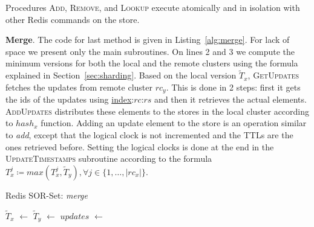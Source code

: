 Procedures {\small\textsc{Add}}, {\small\textsc{Remove}}, and
{\small\textsc{Lookup}} execute atomically and in isolation with other Redis
commands on the store.

\textbf{Merge}. The code for last method is given in Listing~\ref{alg:merge}.
For lack of space we present only the main subroutines. On lines 2 and 3
we compute the minimum versions for both the local and the remote clusters
using the formula explained in Section~\ref{sec:sharding}. Based on the local
version $\tilde{T}_{x}$, {\small\textsc{GetUpdates}} fetches the updates from
remote cluster $rc_{y}$. This is done in 2 steps: first it gets the ids of
the updates using \underline{index}:$rc$:$rs$ and then it retrieves the actual
elements. {\small\textsc{AddUpdates}} distributes these elements to the stores
in the local cluster according to $hash_{x}$ function. Adding an update element
to the store is an operation similar to \textit{add}, except that the logical
clock is not incremented and the TTLs are the ones retrieved before. Setting the
logical clocks is done at the end in the {\small\textsc{UpdateTimestamps}}
subroutine according to the formula $T_{x}^{j} \coloneqq max(T_{x}^{j},
\tilde{T}_{y}), \forall j \in \{1,\ldots,|rc_{x}|\}$.

\begin{algorithm}[t]
\small{
	\caption{Redis SOR-Set: \textit{merge}}
 	\label{alg:merge}
 	\begin{algorithmic}[1]
 	    \State $\tilde{T}_{x}$ $\gets$ 
 	    \State $\tilde{T}_{y}$ $\gets$ 
 	    \State $updates$ $\gets$ 
 	    \State {}
 	    \State {}
 	  \EndProcedure
 	\end{algorithmic}
}
\end{algorithm}
